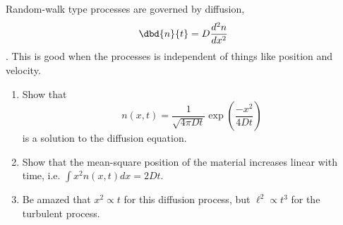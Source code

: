 
   Random-walk type processes are governed by diffusion,
      $$\dbd{n}{t} = D \frac{d^2 n}{d x^2}$$.
      This is good when the processes is independent of things like position and
      velocity.  
      \begin{enumerate}
          \item {} Show that $$n(x,t) = \frac{1}{\sqrt{4 \pi D t}}\exp{\left(\frac{-x^2}{4 D
              t}\right)}$$ is a solution to the diffusion equation.  
          \item {} Show that the mean-square position of the material
              increases linear with time, i.e.  $\int x^2
              n(x,t) dx = 2 D t$.  
          \item Be amazed that $x^2\propto t$ for this diffusion process, but
              $\ell^2 \propto t^3$ for the turbulent process.
      \end{enumerate}


